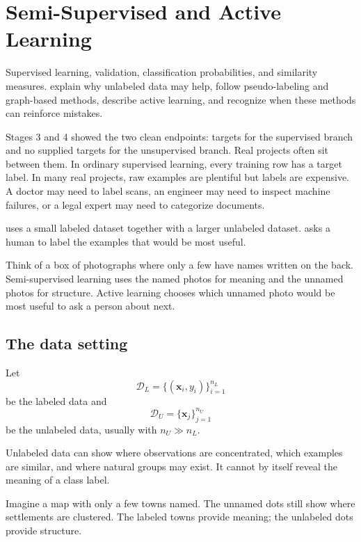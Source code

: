 \chapter{Semi-Supervised and Active Learning}
\label{ch:semi-supervised}

\chapterguide%
  {Supervised learning, validation, classification probabilities, and similarity measures.}
  {explain why unlabeled data may help, follow pseudo-labeling and graph-based methods, describe active learning, and recognize when these methods can reinforce mistakes.}

Stages 3 and 4 showed the two clean endpoints: targets for the supervised branch and no supplied targets for the unsupervised branch. Real projects often sit between them. In ordinary supervised learning, every training row has a target label. In many real projects, raw examples are plentiful but labels are expensive. A doctor may need to label scans, an engineer may need to inspect machine failures, or a legal expert may need to categorize documents.

 uses a small labeled dataset together with a larger unlabeled dataset.  asks a human to label the examples that would be most useful.

\begin{firstread}
Think of a box of photographs where only a few have names written on the back. Semi-supervised learning uses the named photos for meaning and the unnamed photos for structure. Active learning chooses which unnamed photo would be most useful to ask a person about next.
\end{firstread}

\section{The data setting}

Let
\[
  \mathcal{D}_L=\{(\bm{x}_i,y_i)\}_{i=1}^{n_L}
\]
be the labeled data and
\[
  \mathcal{D}_U=\{\bm{x}_j\}_{j=1}^{n_U}
\]
be the unlabeled data, usually with $n_U\gg n_L$.

Unlabeled data can show where observations are concentrated, which examples are similar, and where natural groups may exist. It cannot by itself reveal the meaning of a class label.

\begin{intuition}
Imagine a map with only a few towns named. The unnamed dots still show where settlements are clustered. The labeled towns provide meaning; the unlabeled dots provide structure.
\end{intuition}


